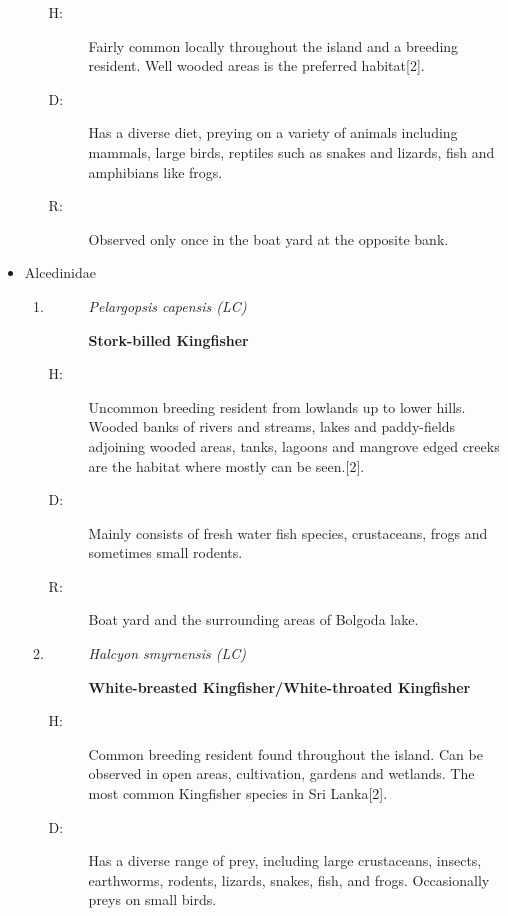 \begin{itemize}
\begin{enumerate}
\begin{description}
\end{description}%
\begin{description}%
\item[H: ]%
Fairly common locally throughout the island and a breeding resident. Well wooded areas is the preferred habitat{[}2{]}.%
\item[D: ]%
Has a diverse diet, preying on a variety of animals including mammals, large birds, reptiles such as snakes and lizards, fish and amphibians like frogs.%
\item[R: ]%
Observed only once in the boat yard at the opposite bank.%
\end{description}%
\end{enumerate}%
\item%
Alcedinidae%
\begin{enumerate}%
\item%
\begin{description}%
\item[]%
\textit{Pelargopsis capensis (LC)}%
\item[]%
\textbf{Stork{-}billed Kingfisher}%
\end{description}%
\begin{description}%
\item[H: ]%
Uncommon breeding resident from lowlands up to lower hills. Wooded banks of rivers and streams, lakes and paddy-fields adjoining wooded areas, tanks, lagoons and mangrove edged creeks are the habitat where mostly can be seen.{[}2{]}.%
\item[D: ]%
Mainly consists of fresh water fish species, crustaceans, frogs and sometimes small rodents.%
\item[R: ]%
Boat yard and the surrounding areas of Bolgoda lake.%
\end{description}%
\item%
\begin{description}%
\item[]%
\textit{Halcyon smyrnensis (LC)}%
\item[]%
\textbf{White{-}breasted Kingfisher/White{-}throated Kingfisher}%
\end{description}%
\begin{description}%
\item[H: ]%
Common breeding resident found throughout the island. Can be observed in open areas, cultivation, gardens and wetlands. The most common Kingfisher species in Sri Lanka{[}2{]}.%
\item[D: ]%
Has a diverse range of prey, including large crustaceans, insects, earthworms, rodents, lizards, snakes, fish, and frogs. Occasionally preys on small birds.%

\end{description}
\end{enumerate}
\end{itemize}
